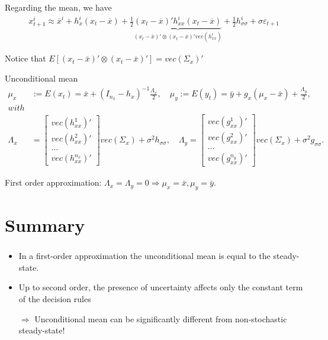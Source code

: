 \documentclass[handout]{beamer}  %
\begin{document}
\begin{frame}
\frametitle{\secname}\framesubtitle{\subsecname}\footnotesize
Regarding the mean, we have
\begin{align*}
  x_{t+1}^i \approx \overline{x}^i + h_{x}^i (x_t - \overline{x}) + \frac{1}{2} \underbrace{(x_t - \overline{x})' h_{xx}^i (x_t - \overline{x})}_{(x_t-\bar{x})'\otimes(x_t-\bar{x})' vec(h_{xx}^i)}  + \frac{1}{2} h_{\sigma\sigma}^i + \sigma \varepsilon_{t+1}
\end{align*}

Notice that $E\left[(x_t-\bar{x})'\otimes(x_t-\bar{x})'\right]=vec(\Sigma_x)'$
\begin{block}{Unconditional mean}\footnotesize
\begin{align*}
  \mu_x &:= E (x_t) = \bar{x} + \left(I_{n_x}-h_x\right)^{-1} \frac{ \Lambda_x}{2},\quad
  \mu_y :=   E (y_t) = \bar{y} +g_x (\mu_x - \bar{x})+ \frac{ \Lambda_y}{2},\\
 with \\ \Lambda_x &=  \begin{bmatrix} vec(h_{xx}^1)'\\vec(h_{xx}^2)'\\ \dots \\ vec(h_{xx}^{n_x})'\end{bmatrix}  vec(\Sigma_x)  + \sigma^2 h_{\sigma\sigma},\quad
  \Lambda_y =  \begin{bmatrix} vec(g_{xx}^1)'\\vec(g_{xx}^2)'\\ \dots \\ vec(g_{xx}^{n_y})'\end{bmatrix} vec(\Sigma_x) + \sigma^2 g_{\sigma\sigma}.
\end{align*}
\end{block}
First order approximation: $\Lambda_x=\Lambda_y=0 \Rightarrow \mu_x = \bar{x}, \mu_y = \bar{y}$.
\end{frame}

\section{Summary}
\begin{frame}
\frametitle{\secname}
\begin{itemize}
  \item In a first-order approximation the unconditional mean is equal to the steady-state.
  \item Up to second order, the presence of uncertainty affects only the constant term of the decision rules
  \item[$\Rightarrow$] Unconditional mean can be significantly different from non-stochastic steady-state!
\end{itemize}
\end{frame}
\end{document}
